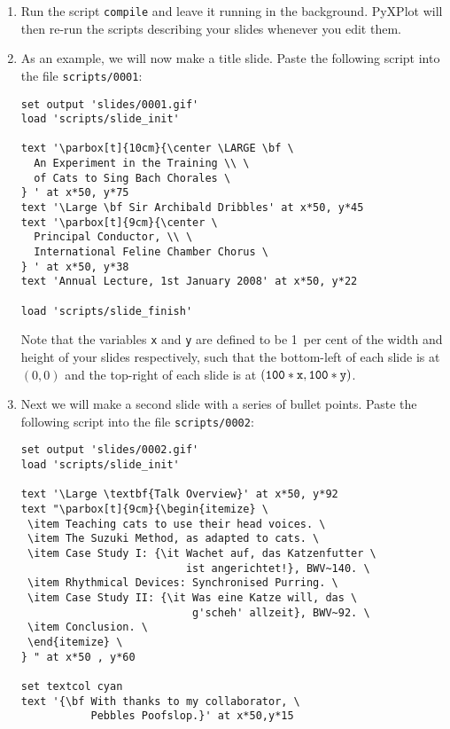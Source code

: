 \begin{enumerate}
\item Run the script {\tt compile} and leave it running in the background.
PyXPlot will then re-run the scripts describing your slides whenever you edit
them.
\item As an example, we will now make a title slide. Paste the following script
into the file {\tt scripts/0001}:
\begin{verbatim}
set output 'slides/0001.gif'
load 'scripts/slide_init'

text '\parbox[t]{10cm}{\center \LARGE \bf \
  An Experiment in the Training \\ \
  of Cats to Sing Bach Chorales \
} ' at x*50, y*75
text '\Large \bf Sir Archibald Dribbles' at x*50, y*45
text '\parbox[t]{9cm}{\center \
  Principal Conductor, \\ \
  International Feline Chamber Chorus \
} ' at x*50, y*38
text 'Annual Lecture, 1st January 2008' at x*50, y*22

load 'scripts/slide_finish'
\end{verbatim}
Note that the variables {\tt x} and {\tt y} are defined to be 1~per cent of the
width and height of your slides respectively, such that the bottom-left of each
slide is at $(0,0)$ and the top-right of each slide is at $({\tt 100*x},{\tt
100*y})$.
\item Next we will make a second slide with a series of bullet points. Paste
the following script into the file {\tt scripts/0002}:
\begin{verbatim}
set output 'slides/0002.gif'
load 'scripts/slide_init'

text '\Large \textbf{Talk Overview}' at x*50, y*92
text "\parbox[t]{9cm}{\begin{itemize} \
 \item Teaching cats to use their head voices. \
 \item The Suzuki Method, as adapted to cats. \
 \item Case Study I: {\it Wachet auf, das Katzenfutter \
                          ist angerichtet!}, BWV~140. \
 \item Rhythmical Devices: Synchronised Purring. \
 \item Case Study II: {\it Was eine Katze will, das \
                           g'scheh' allzeit}, BWV~92. \
 \item Conclusion. \
 \end{itemize} \
} " at x*50 , y*60

set textcol cyan
text '{\bf With thanks to my collaborator, \
           Pebbles Poofslop.}' at x*50,y*15


\end{verbatim}
\end{enumerate}

